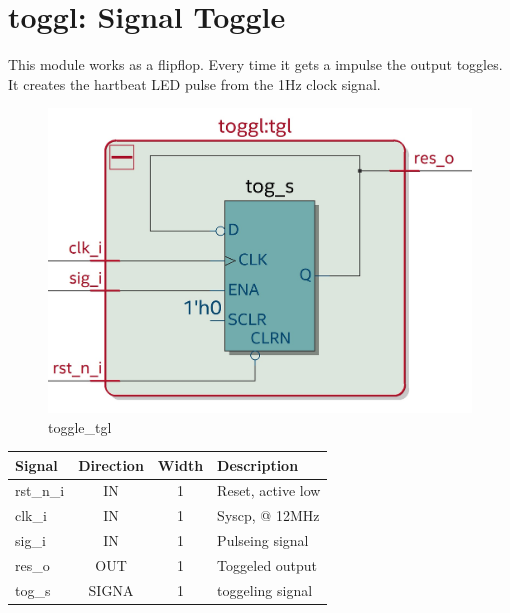 \documentclass[12pt,a4 paper] {report}
\begin{document}
\section{toggl: Signal Toggle}
This module works as a flipflop. Every time it gets a impulse the output toggles. It creates the hartbeat LED pulse 
from the 1Hz clock signal.
\begin{figure}[h]
	\centering	
	\includegraphics[scale=0.15]{../png/toggl_tgl.png}
	\caption{toggle\_tgl}
\end{figure}
\begin{center}
	\begin{tabular}{ | p{2cm} | c | c | p{5cm} |}
		\hline
		\textbf{Signal} & \textbf{Direction} & \textbf{Width} & \textbf{Description} \\
		\hline	
	  rst\_n\_i & IN & 1 & Reset, active low \\
	  \hline
		clk\_i & IN & 1 & Syscp, @ 12MHz \\
		\hline
		sig\_i & IN & 1 & Pulseing signal \\
		\hline
		res\_o & OUT & 1 & Toggeled output \\
		\hline
		\hline	
		tog\_s & SIGNA & 1  & toggeling signal \\
		\hline
	\end{tabular}
\end{center}

\newpage
\end{document}
